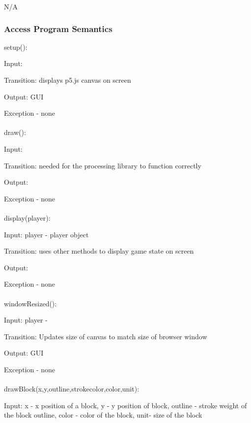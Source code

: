 \documentclass[12,english]{article}
\begin{document}
		N/A

		\subsubsection{Access Program Semantics}
		
		
		
		
		
	  setup():
		
	  Input: 
		
	  Transition: displays p5.js canvas on screen
	  
	  Output: GUI
	  
	  Exception - none\\ 
	  \\
	  draw():
		
	  Input: 
		
	  Transition: needed for the processing library to function correctly
	  
	  Output: 
	  
	  Exception - none\\ 
	  \\
	  display(player):
		
	  Input: player - player object
		
	  Transition: uses other methods to display game state on screen
	  
	  Output: 
	  
	  Exception - none\\
	  \\
	  windowResized():
		
	  Input: player -
		
	  Transition: Updates size of canvas to match size of browser window
	  
	  Output: GUI
	  
	  Exception - none\\ 	  	  
	  \\
	  drawBlock(x,y,outline,strokecolor,color,unit):
		
	  Input: x - x position of a block, y - y position of block, outline - stroke weight of the block outline,
	  color - color of the block, unit- size of the block
		
\end{document}
